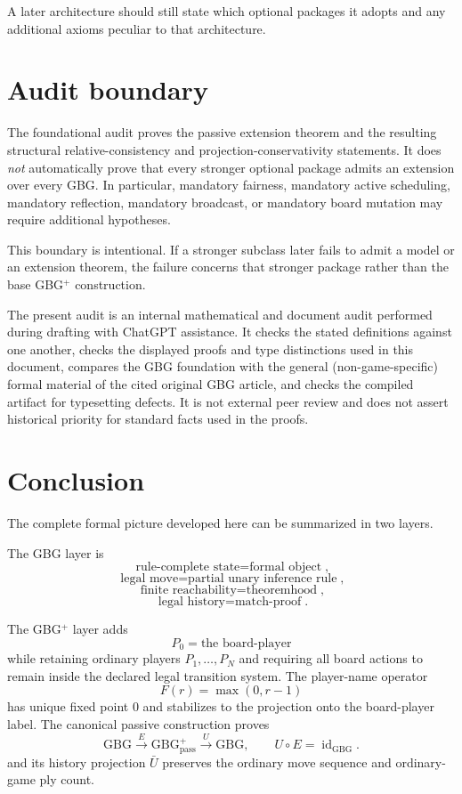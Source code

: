 \documentclass[11pt]{article}
\theoremstyle{definition}
\theoremstyle{remark}
\newcommand{\GBG}{\mathrm{GBG}}
\newcommand{\GBGpass}{\mathrm{GBG}^{+}_{\mathrm{pass}}}
\newcommand{\id}{\operatorname{id}}
\begin{document}
A later architecture should still state which optional packages it adopts and any additional axioms peculiar to that architecture.

\section{Audit boundary}

The foundational audit proves the passive extension theorem and the resulting structural relative-consistency and projection-conservativity statements.  It does \emph{not} automatically prove that every stronger optional package admits an extension over every GBG.  In particular, mandatory fairness, mandatory active scheduling, mandatory reflection, mandatory broadcast, or mandatory board mutation may require additional hypotheses.

This boundary is intentional.  If a stronger subclass later fails to admit a model or an extension theorem, the failure concerns that stronger package rather than the base GBG$^{+}$ construction.

The present audit is an internal mathematical and document audit performed during drafting with ChatGPT assistance.  It checks the stated definitions against one another, checks the displayed proofs and type distinctions used in this document, compares the GBG foundation with the general (non-game-specific) formal material of the cited original GBG article, and checks the compiled artifact for typesetting defects.  It is not external peer review and does not assert historical priority for standard facts used in the proofs.

\section{Conclusion}

The complete formal picture developed here can be summarized in two layers.

The GBG layer is
\[
\boxed{\text{rule-complete state}=\text{formal object}},
\]
\[
\boxed{\text{legal move}=\text{partial unary inference rule}},
\]
\[
\boxed{\text{finite reachability}=\text{theoremhood}},
\]
\[
\boxed{\text{legal history}=\text{match-proof}}.
\]

The GBG$^{+}$ layer adds
\[
\boxed{P_0=\text{the board-player}}
\]
while retaining ordinary players $P_1,\ldots,P_N$ and requiring all board actions to remain inside the declared legal transition system.  The player-name operator
\[
F(r)=\max(0,r-1)
\]
has unique fixed point $0$ and stabilizes to the projection onto the board-player label.  The canonical passive construction proves
\[
\boxed{\GBG\xrightarrow{E}\GBGpass\xrightarrow{U}\GBG,
\qquad U\circ E=\id_{\GBG}.}
\]
and its history projection $\bar U$ preserves the ordinary move sequence and ordinary-game ply count.
\end{document}
